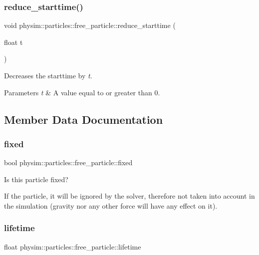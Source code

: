 \subsubsection{\texorpdfstring{reduce\+\_\+starttime()}{reduce\_starttime()}}
{\footnotesize\ttfamily void physim\+::particles\+::free\+\_\+particle\+::reduce\+\_\+starttime (\begin{DoxyParamCaption}\item[{float}]{t }\end{DoxyParamCaption})}



Decreases the starttime by {\itshape t}. 


\begin{DoxyParams}{Parameters}
{\em t} & A value equal to or greater than 0. \\
\hline
\end{DoxyParams}


\subsection{Member Data Documentation}
\mbox{\label{classphysim_1_1particles_1_1free__particle_a0f6d69caeac140abd74c7be4ed55eb74}} 
\subsubsection{\texorpdfstring{fixed}{fixed}}
{\footnotesize\ttfamily bool physim\+::particles\+::free\+\_\+particle\+::fixed}



Is this particle fixed? 

If the particle, it will be ignored by the solver, therefore not taken into account in the simulation (gravity nor any other force will have any effect on it). \mbox{\label{classphysim_1_1particles_1_1free__particle_a5870d6fd3167d2c6120f887f45fe50fc}} 
\subsubsection{\texorpdfstring{lifetime}{lifetime}}
{\footnotesize\ttfamily float physim\+::particles\+::free\+\_\+particle\+::lifetime}



